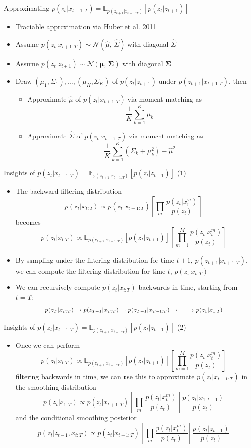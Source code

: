 \documentclass{beamer}
\begin{document}
\begin{frame}{Approximating $p(z_t|x_{t+1:T})=\mathbb{E}_{p(z_{t+1}|x_{t+1:T})}[p(z_t|z_{t+1})]$}
\begin{itemize}
\item Tractable approximation via Huber et al. 2011
\item Assume $p(z_t|x_{t+1:T})\sim \mathcal{N}(\hat\mu,\,\hat\Sigma)$ with diagonal $\hat\Sigma$
\item Assume $p(z_t|z_{t+1})\sim \mathcal{N}(\boldsymbol\mu,\,\boldsymbol\Sigma)$ with diagonal $\boldsymbol\Sigma$
\item Draw $(\mu_1,\Sigma_1),\dots,(\mu_K,\Sigma_K)$ of $p(z_t|z_{t+1})$ under $p(z_{t+1}|x_{t+1:T})$, then
\begin{itemize}
\item Approximate $\hat\mu$ of $p(z_t|x_{t+1:T})$ via moment-matching as\[
\frac{1}{K}\sum_{k=1}^K\mu_k
\]
\item Approximate $\hat\Sigma$ of $p(z_t|x_{t+1:T})$ via moment-matching as\[
\frac{1}{K}\sum_{k=1}^K(\Sigma_k+\mu_k^2)-\hat{\mu}^2
\]
\end{itemize}
\end{itemize}
\end{frame}

\begin{frame}{Insights of $p(z_t|x_{t+1:T})=\mathbb{E}_{p(z_{t+1}|x_{t+1:T})}[p(z_t|z_{t+1})]$ (1)}
\begin{itemize}
\item The backward filtering distribution\[
p(z_t|x_{t:T})\propto p(z_t|x_{t+1:T})\left[\prod_m\frac{p(z_t|x_t^m)}{p(z_t)}\right]
\]becomes\[
p(z_t|x_{t:T})\propto\mathbb{E}_{p(z_{t+1}|x_{t+1:T})}[p(z_t|z_{t+1})]\left[\prod_{m=1}^M\frac{p(z_t|x_t^m)}{p(z_t)}\right]
\]
\item By sampling under the filtering distribution for time $t+1$, $p(z_{t+1}|x_{t+1:T})$, we can compute the filtering distribution for time $t$, $p(z_t|x_{t:T})$
\item We can recursively compute $p(z_t|x_{t:T})$ backwards in time, starting from $t=T$:\[
\scalebox{0.9}{$p(z_{T}|x_{T:T})\to p(z_{T-1}|x_{T:T})\to p(z_{T-1}|x_{T-1:T})\to\dots\to p(z_1|x_{1:T})$}
\]
\end{itemize}
\end{frame}

\begin{frame}{Insights of $p(z_t|x_{t+1:T})=\mathbb{E}_{p(z_{t+1}|x_{t+1:T})}[p(z_t|z_{t+1})]$ (2)}
\begin{itemize}
\item Once we can perform \[
p(z_t|x_{t:T})\propto\mathbb{E}_{p(z_{t+1}|x_{t+1:T})}[p(z_t|z_{t+1})]\left[\prod_{m=1}^M\frac{p(z_t|x_t^m)}{p(z_t)}\right]
\]filtering backwards in time, we can use this to approximate $p(z_t|x_{t+1:T})$ in the smoothing distribution\[
p(z_t|x_{1:T})\propto p(z_t|x_{t+1:T})\left[\prod_m\frac{p(z_t|x_t^m)}{p(z_t)}\right]\frac{p(z_t|x_{1:t-1})}{p(z_t)}
\]and the conditional smoothing posterior\[
p(z_t|z_{t-1},x_{t:T})\propto p(z_t|x_{t+1:T})\left[\prod_m \frac{p(z_t|x_t^m)}{p(z_t)}\right]\frac{p(z_t|z_{t-1})}{p(z_t)}
\]
\end{itemize}
\end{frame}
\end{document}
